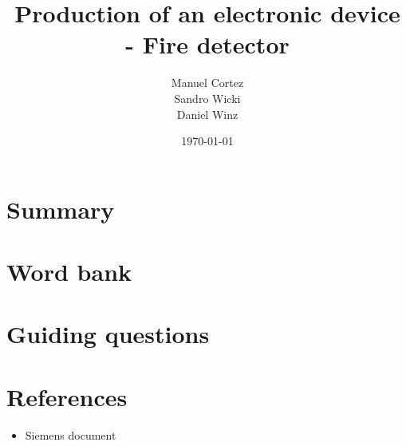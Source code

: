\documentclass[a4paper]{article}
\title{Production of an electronic device - Fire detector}
\author{Manuel Cortez\\Sandro Wicki\\Daniel Winz}
\date{\today}
\begin{document}
\maketitle

\section{Summary}


\section{Word bank}


\section{Guiding questions}


\section{References}
\begin{itemize}
    \item Siemens document
\end{itemize}
\end{document}
